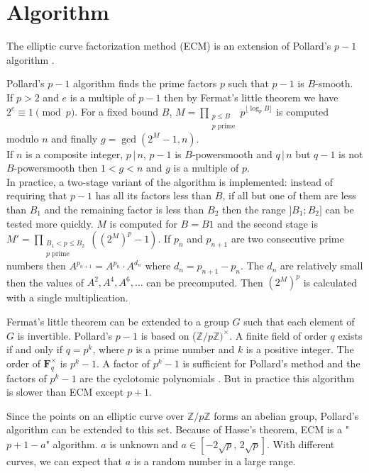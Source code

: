 \documentclass[a4paper, 11pt, pdftex]{report}
\theoremstyle{plain}
\theoremstyle{definition}
\begin{document}
\section{Algorithm}

The elliptic curve factorization method (ECM) is an extension of Pollard's $p - 1$ algorithm
\cite{Pollard1}.

Pollard's $p - 1$ algorithm finds the prime factors $p$ such that $p - 1$ is $B$-smooth.\\
If $p > 2$ and $e$ is a multiple of $p - 1$ then by Fermat's little theorem we have
$2^e \equiv 1  \pmod{p}$. For a fixed bound $B$,
$M = \prod_{\substack{p \le B\\ p \text{ prime}}} p^{ \lfloor \log_p{B} \rfloor }$
is computed modulo $n$ and finally $g = \gcd(2^M - 1, n)$.\\ If $n$ is a composite integer,
$p\, |\, n$, $p - 1$ is $B$-powersmooth and $q\, |\, n$ but $q - 1$ is not $B$-powersmooth
then $ 1 < g < n$ and $g$ is a multiple of $p$.\\
In practice, a two-stage variant of the algorithm is implemented: instead of requiring that
$p - 1$ has all its factors less than $B$, if all but one of them are less than $B_1$ and
the remaining factor is less than $B_2$ then the range $]B_1; B_2]$ can be tested more quickly.
$M$ is computed for $B = B1$ and the second stage is
$M' = \prod_{\substack{B_1 < p \le B_2\\ p \text{ prime}}} \left((2^M)^p - 1 \right)$.
If $p_n$ and $p_{n+1}$ are two consecutive prime numbers then $A^{p_{n+1}} = A^{p_n} \cdot A^{d_n}$
where $d_n = p_{n+1} - p_n$. The $d_n$ are relatively small then the values of $A^2, A^4, A^6, \ldots$
can be precomputed. Then $\left(2^M \right)^p$ is calculated with a single multiplication. 

Fermat's little theorem can be extended to a group $G$ such that each element of $G$ is invertible. 
Pollard's $p - 1$ is based on ($\mathbb{Z}/p\mathbb{Z})^\times$.  A finite field of order $q$ exists
if and only if $q = p^k$, where $p$ is a prime number and $k$ is a positive integer. The order of
$\mathbf{F}_q^\times$ is $p^k - 1$. A factor of $p^k - 1$ is sufficient for Pollard's method and
the factors of $p^k - 1$ are the cyclotomic polynomials \cite{BachShallit1}. But in practice
this algorithm is slower than ECM except $p + 1$.

Since the points on an elliptic curve over $\mathbb{Z}/p\mathbb{Z}$ forms an abelian group,
Pollard's algorithm can be extended to this set. Because of Hasse's theorem, ECM is a
"$p + 1 - a$" algorithm. $a$ is unknown and $a \in [-2\sqrt{p},\, 2\sqrt{p}]$. With different curves,
we can expect that $a$ is a random number in a large range.
\end{document}
